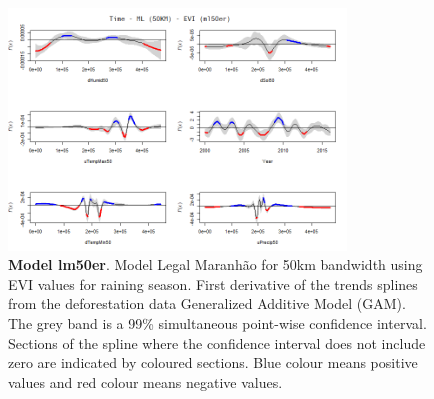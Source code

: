 \begin{table}


\begin{figure}[H]
 \centering
        \centering
        \includegraphics[width=0.8\textwidth]{ml50er.png} %
        \caption[Model Legal Maranhão for 50km bandwidth using EVI values for raining season. First derivative of the trends splines from the deforestation data Generalized Additive Model (GAM)]{\textbf{Model lm50er}. Model Legal Maranhão for 50km bandwidth using EVI values for raining season. First derivative of the trends splines from the deforestation data Generalized Additive Model (GAM). The grey band is a 99\% simultaneous point-wise confidence interval. Sections of the spline where the confidence interval does not include zero are indicated by coloured sections. Blue colour means positive values and red colour means negative values.}
        \centering
\end{figure}
\end{table}

